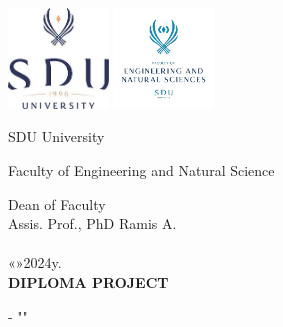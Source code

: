 \newpage
\pagestyle{empty}
\begin{center}

\includegraphics[width=0.2\textwidth]{figures/logo1.png} %
\includegraphics[width=0.2\textwidth]{figures/logo2.png}

\vspace{0.5cm}
\large
 SDU University

 Faculty of Engineering and Natural Science
\vspace{3cm}

\hspace{9.5cm} Dean of Faculty \\
\hspace{9.5cm} Assis. Prof., PhD Ramis A. \\
\hspace{9.5cm}\underline{\hspace{6cm}} \\
\hspace{9.5cm}«\underline{\hspace{0.5cm}}»\underline{\hspace{4cm}}2024y. \\



\vspace{2.5cm}
\LARGE\textbf{DIPLOMA PROJECT}

\vspace{0.5cm}
\small\mytitle

\vspace{0.5cm}
\mydegreecode - "\mydegree"


\end{center}
